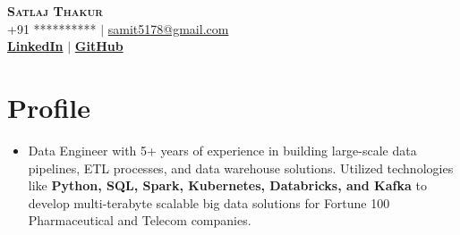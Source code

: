 \documentclass[letterpaper,11pt]{article}
\begin{document}




\begin{center}
    \textbf{\Huge \scshape Satlaj Thakur} \\ \vspace{1pt}
    \small +91 ********** $|$ \href{mailto:samit5178@gmail.com}{{samit5178@gmail.com}}    \\ 
    \small  
    \href{https://www.linkedin.com/in/satlajthakur20/}{\bf LinkedIn} $|$
    \href{https://github.com/manisnitt}{\bf GitHub} 
    
\end{center}



\section{Profile}
\begin{itemize}[leftmargin=0.15in, label={}]
\item 
Data Engineer with 5+ years of experience in building large-scale data pipelines, ETL processes, and data warehouse solutions. Utilized technologies like \textbf{Python, SQL, Spark, Kubernetes, Databricks, and Kafka} to develop multi-terabyte scalable big data solutions for Fortune 100 Pharmaceutical and Telecom companies.
\end{itemize}
\end{document}
